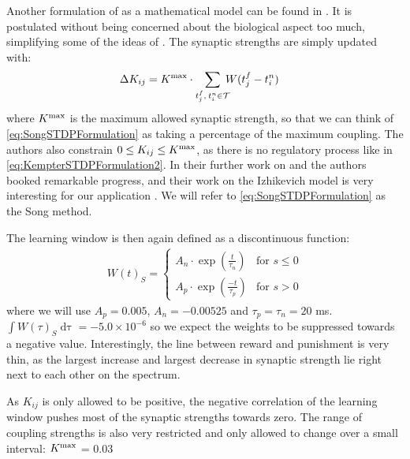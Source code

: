 Another formulation of \STDP as a mathematical model can be found in \cite{Song2000}. It is postulated without being concerned about the biological aspect too much, simplifying some of the ideas of \cite{Kempter1999}. The synaptic strengths are simply updated with:
\begin{align}
\Delta K_{ij} &= K^{\rm max} \cdot \sum_{t_{j}^{f}, \: t_i^{n} \in \mathcal{T}} \hspace{-2mm} W (t_{j}^{f}-t_i^{n} ) \label{eq:SongSTDPFormulation}
\end{align}
where $K^{\rm max}$ is the maximum allowed synaptic strength, so that we can think of \eqref{eq:SongSTDPFormulation} as taking a percentage of the maximum coupling. The authors also constrain $0 \leq K_{ij} \leq K^{\rm max}$, as there is no regulatory process like in \eqref{eq:KempterSTDPFormulation2}. In their further work on \STDP and \IP the authors booked remarkable progress, and their work on the Izhikevich model is very interesting for our application \cite{Song2017}. We will refer to \eqref{eq:SongSTDPFormulation} as the Song method. 

The learning window is then again defined as a discontinuous function:
\begin{align}
W(t)_S =
\begin{cases}
A_{n} \cdot \exp \left(\frac{t}{\tau_n}\right)  & \text{for } s \leq 0 \\
A_{p} \cdot \exp \left(\frac{-t}{\tau_p}\right) & \text{for } s > 0 
\end{cases} \label{eq:learningwindowSong2000}
\end{align}
where we will use $A_p = 0.005$, $A_n = -0.00525$ and $\tau_p = \tau_n = 20$ ms. $\int W(\tau)_S \mathop{d \tau} = -5.0 \times 10^{-6}$ so we expect the weights to be suppressed towards a negative value. Interestingly, the line between reward and punishment is very thin, as the largest increase and largest decrease in synaptic strength lie right next to each other on the spectrum. 

As $K_{ij}$ is only allowed to be positive, the negative correlation of the learning window pushes most of the synaptic strengths towards zero. The range of coupling strengths is also very restricted and only allowed to change over a small interval: $K^{\rm max}$ = 0.03 \cite{Song2000, Song2017, ChrolCannon2012}
\\


